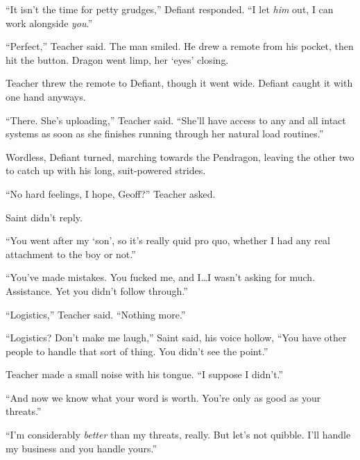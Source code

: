 ``It isn't the time for petty grudges,'' Defiant responded.  ``I let \emph{him} out, I can work alongside \emph{you}.''



``Perfect,'' Teacher said.  The man smiled.  He drew a remote from his pocket, then hit the button.  Dragon went limp, her `eyes' closing.



Teacher threw the remote to Defiant, though it went wide.  Defiant caught it with one hand anyways.



``There.  She's uploading,'' Teacher said.  ``She'll have access to any and all intact systems as soon as she finishes running through her natural load routines.''



Wordless, Defiant turned, marching towards the Pendragon, leaving the other two to catch up with his long, suit-powered strides.



``No hard feelings, I hope, Geoff?'' Teacher asked.



Saint didn't reply.



``You went after my `son', so it's really quid pro quo, whether I had any real attachment to the boy or not.''



``You've made mistakes.  You fucked me, and I\ldots I wasn't asking for much.  Assistance.  Yet you didn't follow through.''



``Logistics,'' Teacher said.  ``Nothing more.''



``Logistics?  Don't make me laugh,'' Saint said, his voice hollow, ``You have other people to handle that sort of thing.  You didn't see the point.''



Teacher made a small noise with his tongue.  ``I suppose I didn't.''



``And now we know what your word is worth.  You're only as good as your threats.''



``I'm considerably \emph{better} than my threats, really.  But let's not quibble.  I'll handle my business and you handle yours.''



